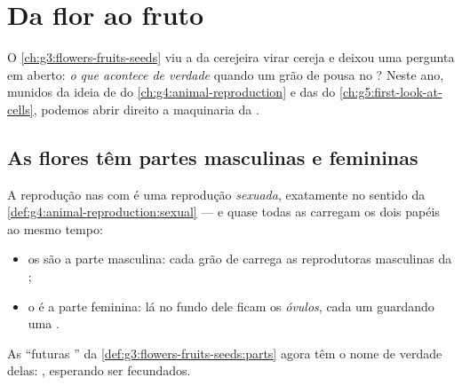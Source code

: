 \chapter{Da flor ao fruto}\label{ch:g5:flower-to-fruit}

O \cref{ch:g3:flowers-fruits-seeds} viu a  da cerejeira virar
cereja e deixou uma pergunta em aberto: \emph{o que acontece de
verdade} quando um grão de  pousa no ? Neste ano,
munidos da ideia de  do \cref{ch:g4:animal-reproduction} e
das  do \cref{ch:g5:first-look-at-cells}, podemos abrir
direito a maquinaria da .

\section{As flores têm partes masculinas e femininas}

\begin{proposition}\label{prop:g5:flower-to-fruit:roles}
A reprodução nas  com  é uma reprodução \emph{sexuada},
exatamente no sentido da
\cref{def:g4:animal-reproduction:sexual} --- e quase todas as 
carregam os dois papéis ao mesmo tempo:
\begin{itemize}
  \item os \emph{} são a parte masculina: cada grão de
        \emph{} carrega as  reprodutoras masculinas da
        ;
  \item o \emph{} é a parte feminina: lá no fundo dele ficam
        os \emph{óvulos}, cada um guardando uma .
\end{itemize}
As ``futuras '' da
\cref{def:g3:flowers-fruits-seeds:parts} agora têm o nome de
verdade delas: , esperando ser fecundados.
\end{proposition}
\admitted

